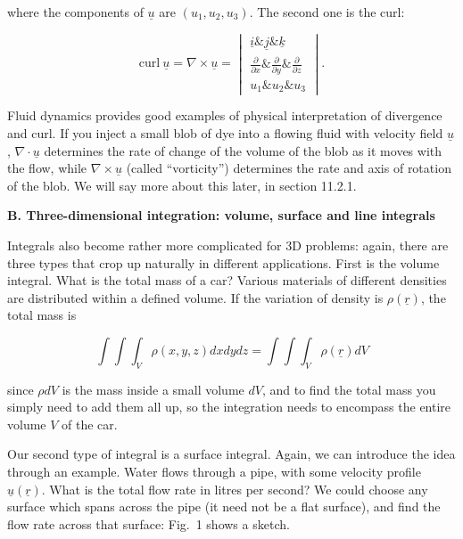   where the components of $\underline{u}$ are $(u_1,u_2,u_3)$. The second one 
  is the curl: 

  $$\mathrm{curl~} \underline{u} = \nabla \times \underline{u} =\begin{vmatrix} 
  \underline{i}\&\underline{j}\&\underline{k}\\ \frac{\partial}{\partial 
  x}\&\frac{\partial}{\partial y}\&\frac{\partial}{\partial z}\\u_1\&u_2\&u_3 
  \end{vmatrix} . \tag{7}$$ 

  Fluid dynamics provides good examples of physical interpretation of 
  divergence and curl. If you inject a small blob of dye into a flowing fluid 
  with velocity field $\underline{u}$, $\nabla \cdot \underline{u}$ determines 
  the rate of change of the volume of the blob as it moves with the flow, while 
  $\nabla \times \underline{u}$ (called ``vorticity'') determines the rate and 
  axis of rotation of the blob. We will say more about this later, in section 
  11.2.1. 

  \textbf{B. Three-dimensional integration: volume, surface and line integrals} 

  Integrals also become rather more complicated for 3D problems: again, there 
  are three types that crop up naturally in different applications. First is 
  the volume integral. What is the total mass of a car? Various materials of 
  different densities are distributed within a defined volume. If the variation 
  of density is $\rho(\underline{r})$, the total mass is 

  $$\int{\int{\int_V{\rho(x,y,z) dx}dy}dz} = 
  \int{\int{\int_V{\rho(\underline{r})}}dV} \tag{8}$$ 

  since $\rho dV$ is the mass inside a small volume $dV$, and to find the total 
  mass you simply need to add them all up, so the integration needs to 
  encompass the entire volume $V$ of the car. 

  Our second type of integral is a surface integral. Again, we can introduce 
  the idea through an example. Water flows through a pipe, with some velocity 
  profile $\underline{u}(\underline{r})$. What is the total flow rate in litres 
  per second? We could choose any surface which spans across the pipe (it need 
  not be a flat surface), and find the flow rate across that surface: Fig.\ 1 
  shows a sketch. 


